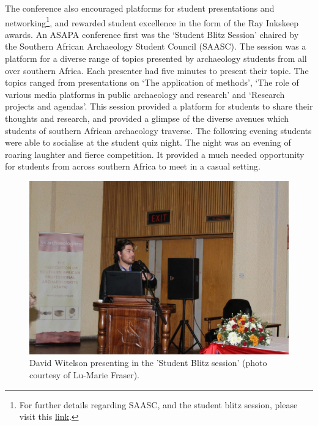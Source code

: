 	The conference also encouraged platforms for student presentations and networking\footnote{For further details regarding SAASC, and the student blitz session, please visit this \href{http://saasc.co.za/index.php/2015/07/21/asapa-2015-student-blitz-session/}{link}.}, and rewarded student excellence in the form of the Ray Inkskeep awards. An ASAPA conference first was the ‘Student Blitz Session’ chaired by the Southern African Archaeology Student Council (SAASC). The session was a platform for a diverse range of topics presented by archaeology students from all over southern Africa. Each presenter had five minutes to present their topic. The topics ranged from presentations on ‘The application of methods’, ‘The role of various media platforms in public archaeology and research’ and ‘Research projects and agendas’. This session provided a platform for students to share their thoughts and research, and provided a glimpse of the diverse avenues which students of southern African archaeology traverse. The following evening students were able to socialise at the student quiz night. The night was an evening of roaring laughter and fierce competition. It provided a much needed opportunity for students from across southern Africa to meet in a casual setting. 
		
	\begin{figure}
		\includegraphics[width=\linewidth]{figures/asapa_02}%
		\caption{David Witelson presenting in the 'Student Blitz session' (photo courtesy of Lu-Marie Fraser).}
		\label{asapa_02} %
	\end{figure}
	
